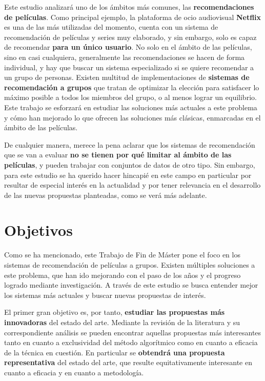 Este estudio analizará uno de los ámbitos más comunes, las \textbf{recomendaciones de películas}. Como principal ejemplo, la plataforma de ocio audiovisual \textbf{Netflix} es una de las más utilizadas del momento, cuenta con un sistema de recomendación de películas y series muy elaborado, y sin embargo, solo es capaz de recomendar \textbf{para un único usuario}. No solo en el ámbito de las películas, sino en casi cualquiera, generalmente las recomendaciones se hacen de forma individual, y hay que buscar un sistema especializado si se quiere recomendar a un grupo de personas. Existen multitud de implementaciones de \textbf{sistemas de recomendación a grupos} \cite{masthoff-handbook} que tratan de optimizar la elección para satisfacer lo máximo posible a todos los miembros del grupo, o al menos lograr un equilibrio. Este trabajo se esforzará en estudiar las soluciones más actuales a este problema y cómo han mejorado lo que ofrecen las soluciones más clásicas, enmarcadas en el ámbito de las películas.

De cualquier manera, merece la pena aclarar que los sistemas de recomendación que se van a evaluar \textbf{no se tienen por qué limitar al ámbito de las películas}, y pueden trabajar con conjuntos de datos de otro tipo. Sin embargo, para este estudio se ha querido hacer hincapié en este campo en particular por resultar de especial interés en la actualidad y por tener relevancia en el desarrollo de las nuevas propuestas planteadas, como se verá más adelante.

\section{Objetivos}

Como se ha mencionado, este Trabajo de Fin de Máster pone el foco en los sistemas de recomendación de películas a grupos. Existen múltiples soluciones a este problema, que han ido mejorando con el paso de los años y el progreso logrado mediante investigación. A través de este estudio se busca entender mejor los sistemas más actuales y buscar nuevas propuestas de interés.

El primer gran objetivo es, por tanto, \textbf{estudiar las propuestas más innovadoras} del estado del arte. Mediante la revisión de la literatura y su correspondiente análisis se pueden encontrar aquellas propuestas más interesantes tanto en cuanto a exclusividad del método algorítmico como en cuanto a eficacia de la técnica en cuestión. En particular se \textbf{obtendrá una propuesta representativa} del estado del arte, que resulte equitativamente interesante en cuanto a eficacia y en cuanto a metodología.

